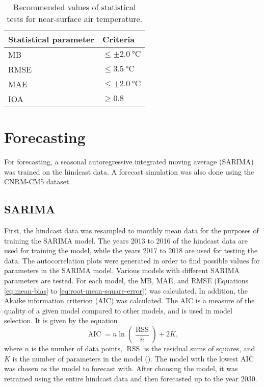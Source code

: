 	\begin{table}	
		\caption{Recommended values of statistical tests for near-surface air temperature.}
		\label{tab:performance-statistics-threshold}
		\centering
		\begin{tabular}{l l}
			\hline \hline
			Statistical parameter & Criteria\\
			\hline
			MB & $\leq \pm \qty{2.0}{\degreeCelsius}$ \\
			RMSE & $\leq \qty{3.5}{\degreeCelsius}$\\
			MAE & $\leq \pm \qty{2.0}{\degreeCelsius}$\\
			IOA	& $\geq \num{0.8}$\\
			\hline
		\end{tabular}		
	\end{table}

\section{Forecasting}
	For forecasting, a seasonal autoregressive integrated moving average (SARIMA) was trained on the hindcast data.
	A forecast simulation was also done using the CNRM-CM5 dataset.
	
	\subsection{SARIMA}
	
		First, the hindcast data was resampled to monthly mean data for the purposes of training the SARIMA model.
		The years 2013 to 2016 of the hindcast data are used for training the model, while the years 2017 to 2018 are used for testing the data.
		The autocorrelation plots were generated in order to find possible values for parameters in the SARIMA model.
		Various models with different SARIMA parameters are tested.
		For each model, the MB, MAE, and RMSE (Equations \ref{eq:mean-bias} to \ref{eq:root-mean-square-error}) was calculated.
		In addition, the Akaike information criterion (AIC) was calculated.
		The AIC is a measure of the quality of a given model compared to other models, and is used in model selection.
		It is given by the equation
		\begin{equation}
			\operatorname{AIC} = n \ln \left( 
				\frac{\operatorname{RSS}}{n} 
			\right) + 2K,
			\label{eq:akaike-information-criterion}
		\end{equation}
		where $n$ is the number of data points,
			$\operatorname{RSS}$ is the residual sums of squares,
			and
			$K$ is the number of parameters in the model
			(\cite{Chen2018}).
		The model with the lowest AIC was chosen as the model to forecast with.
		After choosing the model, it was retrained using the entire hindcast data and then forecasted up to the year 2030.
		
